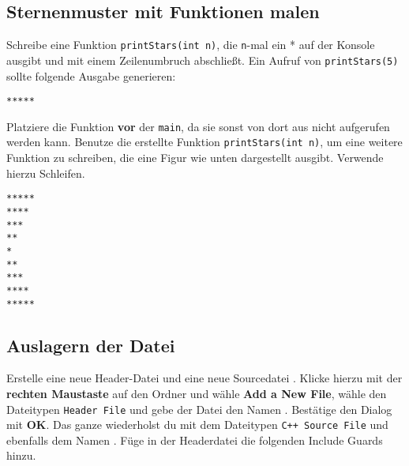 \subsection{Sternenmuster mit Funktionen malen}

Schreibe eine Funktion \lstinline{printStars(int n)}, die \lstinline{n}-mal ein * auf der Konsole ausgibt und mit einem Zeilenumbruch abschließt.
Ein Aufruf von \lstinline{printStars(5)} sollte folgende Ausgabe generieren:

\begin{lstlisting}
*****
\end{lstlisting}

Platziere die Funktion \textbf{vor} der \lstinline{main}, da sie sonst von dort aus nicht aufgerufen werden kann.
Benutze die erstellte Funktion \lstinline{printStars(int n)}, um eine weitere Funktion zu schreiben, die eine Figur wie unten dargestellt ausgibt.
Verwende hierzu Schleifen.

\begin{lstlisting}
*****
****
***
**
*
**
***
****
*****
\end{lstlisting}


\subsection{Auslagern der Datei}
Erstelle eine neue Header-Datei \textbf{} und eine neue
Sourcedatei \textbf{}.
Klicke hierzu mit der \textbf{rechten Maustaste} auf den Ordner \textbf{} und wähle \textbf{Add a New File}, wähle den Dateitypen \texttt{Header File} und gebe der Datei den Namen . 
Bestätige den Dialog mit \textbf{OK}.
Das ganze wiederholst du mit dem Dateitypen \texttt{C++ Source File} und ebenfalls dem Namen .
Füge in der Headerdatei die folgenden Include Guards hinzu.

